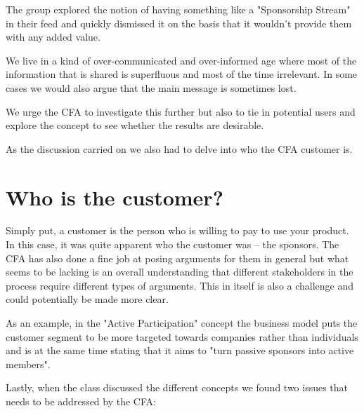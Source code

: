 The group explored the notion of having something like a "Sponsorship Stream" in their feed and quickly dismissed it on the basis that it wouldn't provide them with any added value.

We live in a kind of over-communicated and over-informed age where most of the information that is shared is superfluous and most of the time irrelevant. In some cases we would also argue that the main message is sometimes lost.

We urge the CFA to investigate this further but also to tie in potential users and explore the concept to see whether the results are desirable.


As the discussion carried on we also had to delve into who the CFA customer is. 


\blankpage

\section{Who is the customer?} %
\label{sec:who_is_the_customer_}

Simply put, a customer is the person who is willing to pay to use your product. In this case, it was quite apparent who the customer was – the sponsors. The CFA has also done a fine job at posing arguments for them in general but what seems to be lacking is an overall understanding that different stakeholders in the process require different types of arguments. This in itself is also a challenge and could potentially be made more clear.

As an example, in the "Active Participation" concept the business model puts the customer segment to be more targeted towards companies rather than individuals and is at the same time stating that it aims to "turn passive sponsors into active members".

Lastly, when the class discussed the different concepts we found two issues that needs to be addressed by the CFA:

